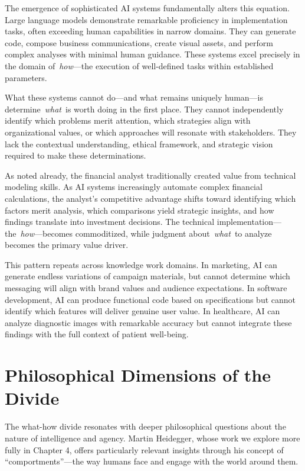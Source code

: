 \documentclass[
  Letterpaper,
]{scrbook}
\begin{document}
The emergence of sophisticated AI systems fundamentally alters this
equation. Large language models demonstrate remarkable proficiency in
implementation tasks, often exceeding human capabilities in narrow
domains. They can generate code, compose business communications, create
visual assets, and perform complex analyses with minimal human guidance.
These systems excel precisely in the domain of~\emph{how}---the
execution of well-defined tasks within established parameters.

What these systems cannot do---and what remains uniquely human---is
determine~\emph{what}~is worth doing in the first place. They cannot
independently identify which problems merit attention, which strategies
align with organizational values, or which approaches will resonate with
stakeholders. They lack the contextual understanding, ethical framework,
and strategic vision required to make these determinations.

As noted already, the financial analyst traditionally created value from
technical modeling skills. As AI systems increasingly automate complex
financial calculations, the analyst's competitive advantage shifts
toward identifying which factors merit analysis, which comparisons yield
strategic insights, and how findings translate into investment
decisions. The technical implementation---the~\emph{how}---becomes
commoditized, while judgment about~\emph{what}~to analyze becomes the
primary value driver.

This pattern repeats across knowledge work domains. In marketing, AI can
generate endless variations of campaign materials, but cannot determine
which messaging will align with brand values and audience expectations.
In software development, AI can produce functional code based on
specifications but cannot identify which features will deliver genuine
user value. In healthcare, AI can analyze diagnostic images with
remarkable accuracy but cannot integrate these findings with the full
context of patient well-being.

\section{Philosophical Dimensions of the
Divide}\label{philosophical-dimensions-of-the-divide}

The what-how divide resonates with deeper philosophical questions about
the nature of intelligence and agency. Martin Heidegger, whose work we
explore more fully in Chapter 4, offers particularly relevant insights
through his concept of ``comportments''---the way humans face and engage
with the world around them.
\end{document}
